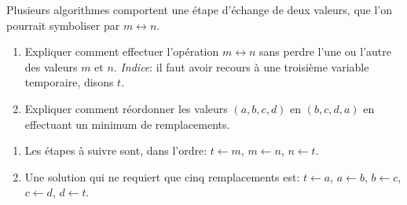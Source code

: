 \begin{exercice}
  Plusieurs algorithmes comportent une étape d'échange de deux
  valeurs, que l'on pourrait symboliser par $m \leftrightarrow n$.
  \begin{enumerate}
  \item Expliquer comment effectuer l'opération $m \leftrightarrow n$
    sans perdre l'une ou l'autre des valeurs $m$ et $n$.
    \emph{Indice}: il faut avoir recours à une troisième variable
    temporaire, disons $t$.
  \item Expliquer comment réordonner les valeurs $(a, b, c, d)$ en
    $(b, c, d, a)$ en effectuant un minimum de remplacements.
  \end{enumerate}
  \begin{sol}
    \begin{enumerate}
    \item Les étapes à suivre sont, dans l'ordre: $t \leftarrow m$, $m
      \leftarrow n$, $n \leftarrow t$.
    \item Une solution qui ne requiert que cinq remplacements est:
      $t \leftarrow a$, $a \leftarrow b$, $b \leftarrow c$,
      $c \leftarrow d$, $d \leftarrow t$.
    \end{enumerate}
  \end{sol}
\end{exercice}

